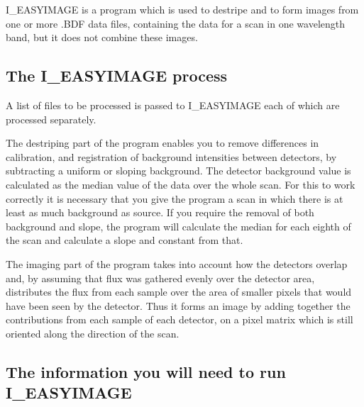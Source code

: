 \documentclass[nolof,noabs,11pt]{starlink}
\begin{document}
I\_EASYIMAGE is a program which is used to destripe and to form images from one
or more .BDF data files, containing the data for a scan in one wavelength band,
but it does not combine these images.

\subsection {The I\_EASYIMAGE process}

A list of files to be processed is passed to I\_EASYIMAGE each of which are
processed separately.

The destriping part of the program enables you to remove differences in
calibration, and registration of background intensities between detectors,
by subtracting a uniform or sloping background. The detector background value
is calculated as the median value of the data over the whole scan. For this to
work correctly it is necessary that you give the program a scan in which there
is at least as much background as source. If you require the removal of both
background and slope, the program will calculate the median for each eighth of
the scan and calculate a slope and constant from that.

The imaging part of the program takes into account how the detectors
overlap and, by assuming that flux was gathered evenly over the detector area,
distributes the flux from each sample over the area of smaller pixels that
would have been seen by the detector. Thus it forms an image by adding
together the contributions from each sample of each detector, on a pixel matrix
which is still oriented along the direction of the scan.

\subsection {The information you will need to run I\_EASYIMAGE}
\end{document}
